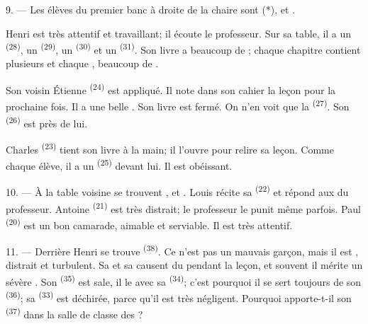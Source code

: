 \VUsaut{3.0mm}

9. --- Les élèves du premier banc à droite de la chaire sont 
(*),  et .

Henri est très attentif et travaillant; il écoute le professeur. Sur sa table,
il a un  \textsuperscript{(28)}, un 
\textsuperscript{(29)}, un  \textsuperscript{(30)} et un
 \textsuperscript{(31)}. Son livre a beaucoup de
; chaque chapitre contient plusieurs  et
chaque , beaucoup de .

Son voisin Étienne \textsuperscript{(24)} est appliqué. Il note dans son cahier
la leçon pour la prochaine fois. Il a une belle . Son livre
est fermé. On n'en voit que la  \textsuperscript{(27)}. Son
 \textsuperscript{(26)} est près de lui.

Charles \textsuperscript{(23)} tient son livre à la main; il l'ouvre pour
relire sa leçon. Comme chaque élève, il a un 
\textsuperscript{(25)} devant lui. Il est obéissant.

10. --- À la table voisine se trouvent ,  et
. Louis récite sa  \textsuperscript{(22)} et répond
aux  du professeur. Antoine \textsuperscript{(21)} est très
distrait; le professeur le punit même parfois. Paul \textsuperscript{(20)} est
un bon camarade, aimable et serviable. Il est très attentif.

\VUsaut{4.2mm}
\VUsaut{3.2mm}

11. --- Derrière Henri se trouve  \textsuperscript{(38)}. Ce
n'est pas un mauvais garçon, mais il est , distrait et
turbulent. Sa  et sa  causent du
 pendant la leçon, et souvent il mérite un sévère
. Son 
\textsuperscript{(35)} est sale, il le  avec sa
 \textsuperscript{(34)}; c'est pourquoi il se sert toujours de
son  \textsuperscript{(36)}; sa 
\textsuperscript{(33)} est déchirée, parce qu'il est très négligent. Pourquoi
apporte-t-il son  \textsuperscript{(37)} dans la salle
de classe des ?

